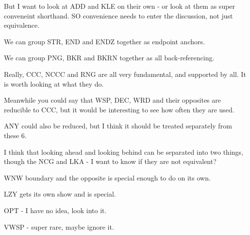 But I want to look at ADD and KLE on their own - or look at them as super conveneint shorthand.  SO convenience needs to enter the discussion, not just equivalence.

We can group STR, END and ENDZ together as endpoint anchors.

We can group PNG, BKR and BKRN together as all back-referencing.

Really, CCC, NCCC and RNG are all very fundamental, and supported by all.  It is worth looking at what they do.

Meanwhile you could say that WSP, DEC, WRD and their opposites are reducible to CCC, but it would be interesting to see how often they are used.

ANY could also be reduced, but I think it should be treated separately from these 6.

I think that looking ahead and looking behind can be separated into two things, though the NCG and LKA - I want to know if they are not equivalent?

WNW boundary and the opposite is special enough to do on its own.

LZY gets its own show and is special.

OPT - I have no idea, look into it.

VWSP - super rare, maybe ignore it.








